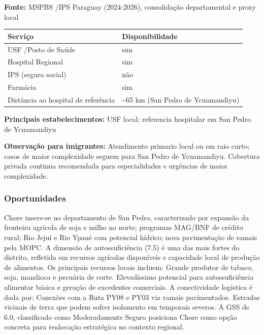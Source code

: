 \textbf{Fonte:} MSPBS /\allowbreak  IPS Paraguay (2024-2026), consolidação
departamental e proxy local

{\def\LTcaptype{none} %
\begin{longtable}[]{@{}
  >{\raggedright\arraybackslash}p{}
  >{\raggedright\arraybackslash}p{}@{}}
\toprule\noalign{}
\begin{minipage}[b]{\linewidth}\raggedright
Serviço
\end{minipage} & \begin{minipage}[b]{\linewidth}\raggedright
Disponibilidade
\end{minipage} \\
\midrule\noalign{}
\endhead
\bottomrule\noalign{}
\endlastfoot
USF /\allowbreak  Posto de Saúde & sim \\
Hospital Regional & sim \\
IPS (seguro social) & não \\
Farmácia & sim \\
Distância ao hospital de referência & \textasciitilde65 km (San Pedro de
Ycuamandiyu) \\
\end{longtable}
}

\textbf{Principais estabelecimentos:} USF local; referencia hospitalar
em San Pedro de Ycuamandiyu

\textbf{Observação para imigrantes:} Atendimento primario local ou em
raio curto; casos de maior complexidade seguem para San Pedro de
Ycuamandiyu. Cobertura privada continua recomendada para especialidades
e urgências de maior complexidade.
\newpage

\subsubsection*{Oportunidades}\label{oport-chore-0203}
Chore insere-se no departamento de San Pedro, caracterizado por expansão da fronteira agrícola de soja e milho no norte; programas MAG/BNF de crédito rural; Rio Jejuí e Rio Ypané com potencial hídrico; nova pavimentação de ramais pela MOPC. A dimensão de autossuficiência (7.5) é uma das mais fortes do distrito, refletida em recursos agrícolas disponíveis e capacidade local de produção de alimentos. Os principais recursos locais incluem: Grande produtor de tabaco, soja, mandioca e pecuária de corte. Elevadíssimo potencial para autossuficiência alimentar básica e geração de excedentes comerciais. A conectividade logística é dada por: Conexões com a Ruta PY08 e PY03 via ramais pavimentados. Estradas vicinais de terra que podem sofrer isolamento em temporais severos. A GSS de 6.0, classificado como Moderadamente Seguro posiciona Chore como opção concreta para realocação estratégica no contexto regional.

